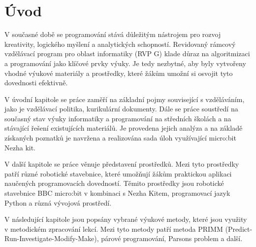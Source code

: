 \documentclass[
  digital,     %
  oneside,     %
  nosansbold,  %
  colorbold, %
  lof,         %
  nolot,         %
]{fithesis4}
\begin{document}

\chapter{Úvod}

V současné době se programování stává důležitým nástrojem pro rozvoj kreativity, logického myšlení a analytických schopností. Revidovaný rámcový vzdělávací program pro oblast informatiky (RVP G) klade důraz na algoritmizaci a programování jako klíčové prvky výuky. Je tedy nezbytné, aby byly vytvořeny vhodné výukové materiály a prostředky, které žákům umožní si osvojit tyto dovednosti efektivně.

V úvodní kapitole se práce zaměří na základní pojmy související s vzděláváním, jako je vzdělávací politika, kurikulární dokumenty. Dále se práce soustředí na současný stav výuky informatiky a programování na středních školách a na stávající řešení existujících materiálů. Je provedena jejich analýza a na základě získaných poznatků je navržena a realizována sada úloh využívající micro:bit Nezha kit. 

V další kapitole se práce věnuje představení prostředků. Mezi tyto prostředky patří různé robotické stavebnice, které umožňují žákům praktickou aplikaci naučených programovacích dovedností. Těmito prostředky jsou robotické stavebnice BBC micro:bit v kombinaci s Nezha Kitem, programovací jazyk Python a různá vývojová prostředí.

V následující kapitole jsou popsány vybrané výukové metody, které jsou využity v metodickém zpracování lekcí. Mezi tyto metody patří metoda PRIMM (Predict-Run-Investigate-Modify-Make), párové programování, Parsons problem a další. 
\end{document}
